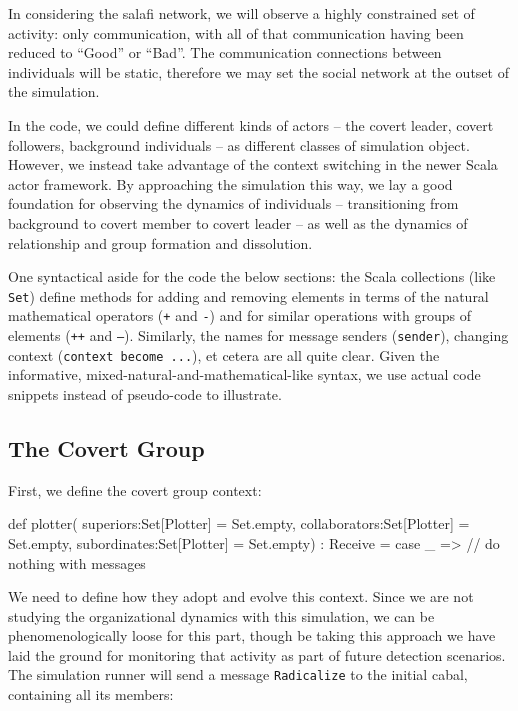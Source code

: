 \documentclass{article}
\begin{document}
In considering the salafi network, we will observe a highly constrained set of activity: only communication, with all of that communication having been reduced to ``Good'' or ``Bad''.  The communication connections between individuals will be static, therefore we may set the social network at the outset of the simulation.

In the code, we could define different kinds of actors -- the covert leader, covert followers, background individuals -- as different classes of simulation object.  However, we instead take advantage of the context switching in the newer Scala actor framework.  By approaching the simulation this way, we lay a good foundation for observing the dynamics of individuals -- transitioning from background to covert member to covert leader -- as well as the dynamics of relationship and group formation and dissolution.

One syntactical aside for the code the below sections: the Scala collections (like \texttt{Set}) define methods for adding and removing elements in terms of the natural mathematical operators (\texttt{+} and \texttt{-}) and for similar operations with groups of elements (\texttt{++} and \texttt{--}).  Similarly, the names for message senders (\texttt{sender}), changing context (\texttt{context become ...}), et cetera are all quite clear.  Given the informative, mixed-natural-and-mathematical-like syntax, we use actual code snippets instead of pseudo-code to illustrate.

\subsection*{The Covert Group}
First, we define the covert group context:

\begin{code}
  def plotter(
    superiors:Set[Plotter] = Set.empty,
    collaborators:Set[Plotter] = Set.empty,
    subordinates:Set[Plotter] = Set.empty) : Receive = {
      case _ => // do nothing with messages
  }
\end{code}

We need to define how they adopt and evolve this context.  Since we are not studying the organizational dynamics with this simulation, we can be phenomenologically loose for this part, though be taking this approach we have laid the ground for monitoring that activity as part of future detection scenarios.  The simulation runner will send a message \texttt{Radicalize} to the initial cabal, containing all its members:
\end{document}

